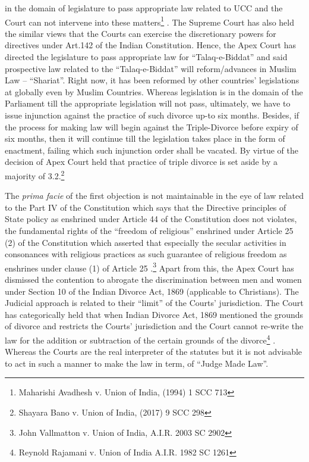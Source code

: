 \begin{multicols}{2}
in the domain of legislature to pass appropriate law related to UCC and the Court can not
intervene into these matters\footnote{Maharishi Avadhesh v. Union of India, (1994) 1 SCC 713}
. The Supreme Court has also held the similar views that the
Courts can exercise the discretionary powers for directives under Art.142 of the Indian
Constitution. Hence, the Apex Court has directed the legislature to pass appropriate law for
“Talaq-e-Biddat” and said prospective law related to the “Talaq-e-Biddat” will
reform/advances in Muslim Law – “Shariat”. Right now, it has been reformed by other
countries’ legislations at globally even by Muslim Countries. Whereas legislation is in the
domain of the Parliament till the appropriate legislation will not pass, ultimately, we have to
issue injunction against the practice of such divorce up-to six months. Besides, if the process
for making law will begin against the Triple-Divorce before expiry of six months, then it will
continue till the legislation takes place in the form of enactment, failing which such
injunction order shall be vacated. By virtue of the decision of Apex Court held that practice
of triple divorce is set aside by a majority of 3.2.\footnote{Shayara Bano v. Union of India, (2017) 9 SCC 298}

\vspace{-.1cm}

\noi 
The {\it prima facie} of the first objection is not maintainable in the eye of law related to the Part
IV of the Constitution which says that the Directive principles of State policy as enshrined
under Article 44 of the Constitution does not violates, the fundamental rights of the “freedom
of religious” enshrined under Article 25 (2) of the Constitution which asserted that especially
the secular activities in consonances with religious practices as such guarantee of religious
freedom as enshrines under clause (1) of Article 25
.\footnote{John Vallmatton v. Union of India, A.I.R. 2003 SC 2902} Apart from this, the Apex Court has
dismissed the contention to abrogate the discrimination between men and women under Section 10 of the Indian Divorce Act, 1869 (applicable to Christians). The Judicial approach
is related to their “limit” of the Courts’ jurisdiction. The Court has categorically held that
when Indian Divorce Act, 1869 mentioned the grounds of divorce and restricts the Courts’
jurisdiction and the Court cannot re-write the law for the addition or subtraction of the certain
grounds of the divorce\footnote{Reynold Rajamani v. Union of India A.I.R. 1982 SC 1261}
. Whereas the Courts are the real interpreter of the statutes but it is not
advisable to act in such a manner to make the law in term, of “Judge Made Law”.


\end{multicols}
